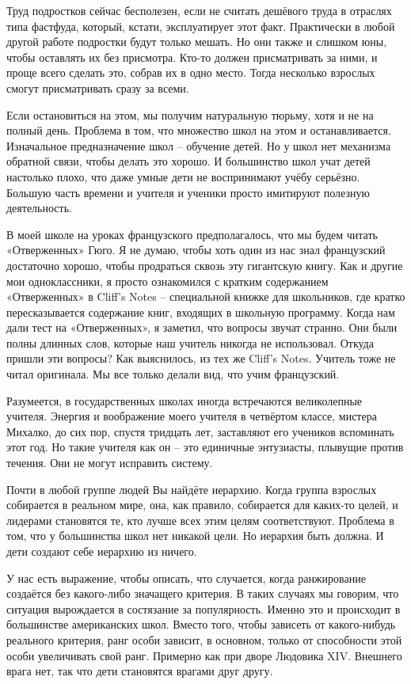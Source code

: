 \documentclass[ebook,12pt,oneside,openany]{memoir}
\begin{document}
Труд подростков сейчас бесполезен, если не считать дешёвого труда в
отраслях типа фастфуда, который, кстати, эксплуатирует этот факт.
Практически в любой другой работе подростки будут только мешать. Но
они также и слишком юны, чтобы оставлять их без присмотра. Кто-то
должен присматривать за ними, и проще всего сделать это, собрав их в
одно место. Тогда несколько взрослых смогут присматривать сразу за
всеми.

Если остановиться на этом, мы получим натуральную тюрьму, хотя и не на
полный день. Проблема в том, что множество школ на этом и
останавливается. Изначальное предназначение школ – обучение детей. Но
у школ нет механизма обратной связи, чтобы делать это хорошо. И
большинство школ учат детей настолько плохо, что даже умные дети не
воспринимают учёбу серьёзно. Большую часть времени и учителя и ученики
просто имитируют полезную деятельность.

В моей школе на уроках французского предполагалось, что мы будем
читать «Отверженных» Гюго. Я не думаю, чтобы хоть один из нас знал
французский достаточно хорошо, чтобы продраться сквозь эту гигантскую
книгу. Как и другие мои одноклассники, я просто ознакомился с кратким
содержанием «Отверженных» в Cliff's Notes – специальной книжке для
школьников, где кратко пересказывается содержание книг, входящих в
школьную программу. Когда нам дали тест на «Отверженных», я заметил,
что вопросы звучат странно. Они были полны длинных слов, которые наш
учитель никогда не использовал. Откуда пришли эти вопросы? Как
выяснилось, из тех же Cliff's Notes. Учитель тоже не читал оригинала.
Мы все только делали вид, что учим французский.

Разумеется, в государственных школах иногда встречаются великолепные
учителя. Энергия и воображение моего учителя в четвёртом классе,
мистера Михалко, до сих пор, спустя тридцать лет, заставляют его
учеников вспоминать этот год. Но такие учителя как он – это единичные
энтузиасты, плывущие против течения. Они не могут исправить систему.


Почти в любой группе людей Вы найдёте иерархию. Когда группа взрослых
собирается в реальном мире, она, как правило, собирается для каких-то
целей, и лидерами становятся те, кто лучше всех этим целям
соответствуют. Проблема в том, что у большинства школ нет никакой
цели. Но иерархия быть должна. И дети создают себе иерархию из ничего.

У нас есть выражение, чтобы описать, что случается, когда ранжирование
создаётся без какого-либо значащего критерия. В таких случаях мы
говорим, что ситуация вырождается в состязание за популярность. Именно
это и происходит в большинстве американских школ. Вместо того, чтобы
зависеть от какого-нибудь реального критерия, ранг особи зависит, в
основном, только от способности этой особи увеличивать свой ранг.
Примерно как при дворе Людовика XIV. Внешнего врага нет, так что дети
становятся врагами друг другу.
\end{document}
